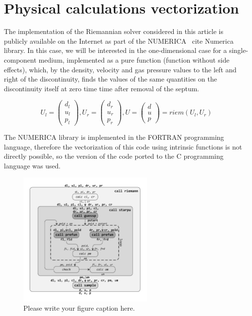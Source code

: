 \documentclass[
11pt,%
tightenlines,%
twoside,%
onecolumn,%
nofloats,%
nobibnotes,%
nofootinbib,%
superscriptaddress,%
noshowpacs,%
centertags]%
{revtex4}
\begin{document}
\section{Physical calculations vectorization}

The implementation of the Riemannian solver considered in this article is publicly available on the Internet as part of the NUMERICA \ cite {Numerica} library. In this case, we will be interested in the one-dimensional case for a single-component medium, implemented as a pure function (function without side effects), which, by the density, velocity and gas pressure values to the left and right of the discontinuity, finds the values of the same quantities on the discontinuity itself at zero time time after removal of the septum.

\begin{equation}\label{eq:riemann}
U_l = \left( \begin{array}{ccc} d_l \\ u_l \\ p_l \end{array} \right),
U_r = \left( \begin{array}{ccc} d_r \\ u_r \\ p_r \end{array} \right),
U = \left( \begin{array}{ccc} d \\ u \\ p \end{array} \right) = riem(U_l, U_r)
\end{equation}

The NUMERICA library is implemented in the FORTRAN programming language, therefore the vectorization of this code using intrinsic functions is not directly possible, so the version of the code ported to the C programming language was used.

\begin{figure}[h]
\setcaptionmargin{5mm}
\onelinecaptionstrue  %
\includegraphics[width=0.6\textwidth]{pics/riemann.pdf}
\caption{Please write your figure caption here.}\label{fig:1}
\end{figure}
\end{document}
